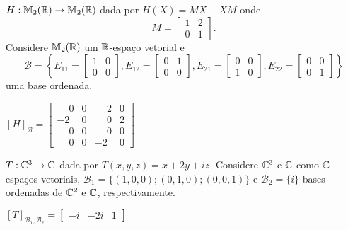 \documentclass[12pt]{exam}
\begin{document}
\begin{exercicio}
    $H : \mathbb{M}_2(\mathbb{R}) \to \mathbb{M}_2(\mathbb{R})$ dada por $H(X) = MX - XM$ onde
    \[
    M = \begin{bmatrix}
        1 & 2\\
        0 & 1
    \end{bmatrix}.
    \]
    Considere $\mathbb{M}_2(\mathbb{R})$ um $\mathbb{R}$-espaço vetorial e
    \[
    \mathcal{B} = \left\{E_{11} = \begin{bmatrix}
        1 & 0\\0 & 0
    \end{bmatrix}, E_{12} = \begin{bmatrix}
        0 & 1\\0 & 0
    \end{bmatrix}, E_{21} = \begin{bmatrix}
        0 & 0\\1 & 0
    \end{bmatrix}, E_{22} = \begin{bmatrix}
        0 & 0\\0 & 1
    \end{bmatrix}\right\}
    \]
    uma base ordenada.

    \begin{solucao}
        $[H]_\mathcal{B} = \begin{bmatrix}
            \phantom{-}0 & 0 & \phantom{-}2 & 0\\
            -2 & 0 & \phantom{-}0 & 2\\
            \phantom{-}0 & 0 & \phantom{-}0 & 0\\
            \phantom{-}0 & 0 & -2 & 0
        \end{bmatrix}$
    \end{solucao}
\end{exercicio}

\begin{exercicio}
    $T : \mathbb{C}^3 \to \mathbb{C}$ dada por $T(x,y,z) = x + 2y + iz$. Considere $\mathbb{C}^3$ e $\mathbb{C}$ como $\mathbb{C}$-espaços vetoriais, $\mathcal{B}_1 = \{(1,0,0); (0,1,0); (0,0,1)\}$ e $\mathcal{B}_2 = \{i\}$ bases ordenadas de $\mathbb{C}^2$ e $\mathbb{C}$, respectivamente.

    \begin{solucao}
        $[T]_{\mathcal{B}_1, \mathcal{B}_2} = \begin{bmatrix}
            -i & -2i & 1
        \end{bmatrix}$
    \end{solucao}
\end{exercicio}
\end{document}
